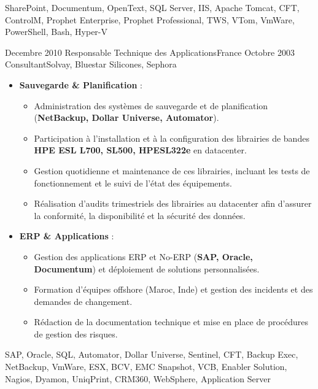 \begin{experiences}
{\begin{itemize}[left=0pt,label={},itemsep=0.4em]
        \end{itemize}
        \vspace{0.5em}  %
    }
    {SharePoint, Documentum, OpenText, SQL Server, IIS, Apache Tomcat, CFT, ControlM, Prophet Enterprise, Prophet Professional, TWS, VTom, VmWare, PowerShell, Bash, Hyper-V}
\emptySeparator


\consultantexperience
    {Decembre 2010} {Responsable Technique des Applications}{}{France}
    {Octobre 2003}    {Consultant}{Solvay, Bluestar Silicones, Sephora} {
        \begin{itemize}[left=0pt,label={},itemsep=0.5em]

          \item \textbf{Sauvegarde \& Planification} :
            \begin{itemize}[itemsep=0.2em,topsep=0.2em,parsep=0pt]
              \small
              \item Administration des systèmes de sauvegarde et de planification (\textbf{NetBackup, Dollar Universe, Automator}).
              \item Participation à l'installation et à la configuration des librairies de bandes \textbf{HPE ESL L700, SL500, HPESL322e} en datacenter.
              \item Gestion quotidienne et maintenance de ces librairies, incluant les tests de fonctionnement et le suivi de l'état des équipements.
              \item Réalisation d'audits trimestriels des librairies au datacenter afin d'assurer la conformité, la disponibilité et la sécurité des données.
            \end{itemize}
            \vspace{0.2em}  %
            
          \item \textbf{ERP \& Applications} :
            \begin{itemize}[itemsep=0.2em,topsep=0.2em,parsep=0pt]
              \small
              \item Gestion des applications ERP et No-ERP (\textbf{SAP, Oracle, Documentum}) et déploiement de solutions personnalisées.
              \item Formation d'équipes offshore (Maroc, Inde) et gestion des incidents et des demandes de changement.
              \item Rédaction de la documentation technique et mise en place de procédures de gestion des risques.
            \end{itemize}
        \end{itemize}
        \vspace{0.5em}  %
    }
    {SAP, Oracle, SQL, Automator, Dollar Universe, Sentinel, CFT, Backup Exec, NetBackup, VmWare, ESX, BCV, EMC Snapshot, VCB, Enabler Solution, Nagios, Dyamon, UniqPrint, CRM360, WebSphere, Application Server}

\emptySeparator
\end{experiences}